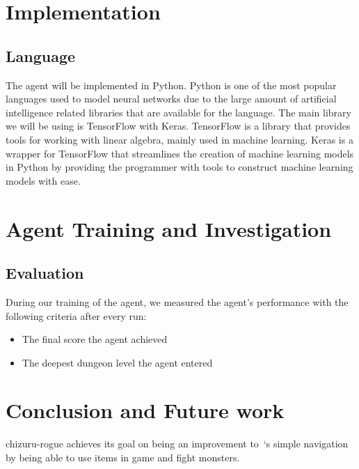 \documentclass[12pt,a4paper]{article}
\begin{document}
    \section{Implementation}\label{sec:implementation}

    \subsection{Language}\label{subsec:language}

    The agent will be implemented in Python.
    Python is one of the most popular languages used to model neural networks due to the large amount of artificial intelligence related libraries that are available for the language.
    The main library we will be using is TensorFlow with Keras.
    TensorFlow is a library that provides tools for working with linear algebra, mainly used in machine learning.
    Keras is a wrapper for TensorFlow that streamlines the creation of machine learning models in Python by providing the programmer with tools to construct machine learning models with ease.


    \section{Agent Training and Investigation}\label{sec:agent-training-and-investigation}

    \subsection{Evaluation}\label{subsec:evaluation}

    During our training of the agent, we measured the agent's performance with the following criteria after every run:
    \begin{itemize}
        \item The final score the agent achieved
        \item The deepest dungeon level the agent entered
    \end{itemize}

    \section{Conclusion and Future work}\label{sec:conclusion-and-future-work}

    chizuru-rogue achieves its goal on being an improvement to~\citet{asperti18}`s simple navigation by being able to use items in game and fight monsters.
\end{document}
